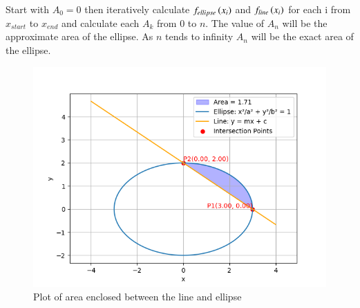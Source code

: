 \documentclass[journal]{IEEEtran}
\begin{document}
Start with $A_0=0$ then iteratively calculate $f_{ellipse}\left(x_i\right)$ and $f_{line}\left(x_{i}\right)$ for each i from $x_{start}$ to $x_{end}$ and calculate each $A_k$ from $0$ to $n$. The value of $A_n$ will be the approximate area of the ellipse. As $n$ tends to infinity $A_n$ will be the exact area of the ellipse.
\begin{figure}[h!]
   \centering
   \includegraphics[width=1\linewidth]{figs/fig.png}
   \caption{Plot of area enclosed between the line and ellipse}
   \label{stemplot}
\end{figure}
\end{document}
